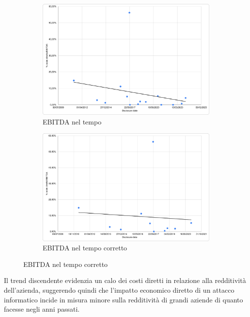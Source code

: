 \documentclass[12pt,a4paper,twoside]{report}
\begin{document}
\begin{figure}[H]
    \centering
    \begin{subfigure}{0.48\textwidth}
        \centering
        \includegraphics[width=1\linewidth]{figures/ebit-date-1.png}
        \caption{EBITDA nel tempo}
        \label{fig:ebit1}
    \end{subfigure}
    \begin{subfigure}{0.48\textwidth}
        \centering
    \includegraphics[width=1\linewidth]{figures/ebit-date-2.png}
    \caption{EBITDA nel tempo corretto}
    \label{fig:ebit2}
    \end{subfigure}
\end{figure}
Il trend discendente evidenzia un calo dei costi diretti in relazione alla redditivit\`a dell'azienda, 
suggerendo quindi che l'impatto economico diretto di un attacco informatico incide in misura minore sulla 
redditivit\`a di grandi aziende di quanto facesse negli anni passati. 
\end{document}
